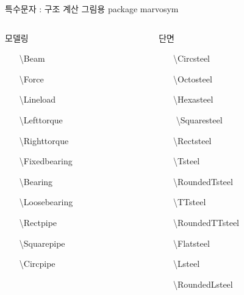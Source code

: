 \documentclass[ aspectratio=149,  14pt,blue,xcolor=pdftex,dvipsnames,table,handout,notes]{beamer}
\begin{document}
		\begin{frame}[t,shrink=0]{특수문자 : 구조 계산 그림용 package marvosym}

			\begin{columns}[t]
			\begin{column}{.4\textwidth}
			\begin{block} { 모델링 }
			\begin{enumerate}
			\item[\Beam			]	\textbackslash Beam	
			\item[\Force			]	\textbackslash Force	
			\item[\Lineload		]	\textbackslash Lineload	
			\item[\Lefttorque		]	\textbackslash Lefttorque	
			\item[\Righttorque		]	\textbackslash Righttorque	
			\item[\Fixedbearing	]	\textbackslash Fixedbearing	
			\item[\Bearing		]	\textbackslash Bearing
			\item[\Loosebearing	]	\textbackslash Loosebearing	

			\item[\Rectpipe		]	\textbackslash Rectpipe
			\item[\Squarepipe		]	\textbackslash Squarepipe	
			\item[\Circpipe		]	\textbackslash Circpipe	
			\end{enumerate}
			\end{block}
			\end{column}

			\begin{column}{.4\textwidth}
			\begin{block} { 단면 }
			\begin{enumerate}
			\item[\Circsteel		]	\textbackslash Circsteel	
			\item[\Octosteel		]	\textbackslash Octosteel	
			\item[\Hexasteel		]	\textbackslash Hexasteel
			\item[\Squaresteel		]	\textbackslash Squaresteel	
			\item[\Rectsteel		]	\textbackslash Rectsteel	

			\item[\Tsteel			]	\textbackslash Tsteel	
			\item[\RoundedTsteel	]	\textbackslash RoundedTsteel	
			\item[\TTsteel		]	\textbackslash TTsteel	
			\item[\RoundedTTsteel	]	\textbackslash RoundedTTsteel
			\item[\Flatsteel		]	\textbackslash Flatsteel	
			\item[\Lsteel			]	\textbackslash Lsteel	
			\item[\RoundedLsteel	]	\textbackslash RoundedLsteel	
			\end{enumerate}
			\end{block}
			\end{column}
			\end{columns}




\end{frame}
\end{document}
